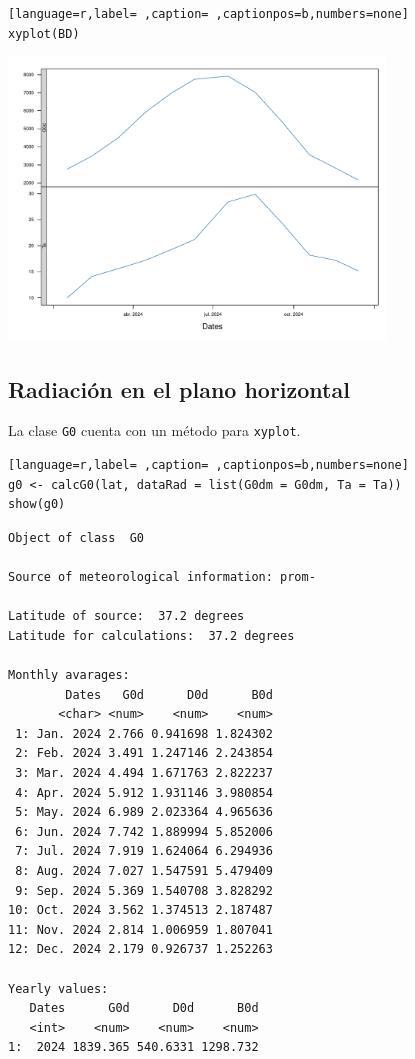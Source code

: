 \begin{lstlisting}[language=r,label= ,caption= ,captionpos=b,numbers=none]
xyplot(BD)
\end{lstlisting}
\begin{center}
\includegraphics[keepaspectratio,width=0.75\textwidth,height=0.5\textheight]{figuras/codigo-meteo.pdf}
\end{center}

\subsection{Radiación en el plano horizontal}
\label{sec:orge431903}
La clase \texttt{G0} cuenta con un método para \texttt{xyplot}.
\begin{lstlisting}[language=r,label= ,caption= ,captionpos=b,numbers=none]
g0 <- calcG0(lat, dataRad = list(G0dm = G0dm, Ta = Ta))
show(g0)
\end{lstlisting}

\begin{verbatim}
Object of class  G0 

Source of meteorological information: prom- 

Latitude of source:  37.2 degrees
Latitude for calculations:  37.2 degrees

Monthly avarages:
        Dates   G0d      D0d      B0d
       <char> <num>    <num>    <num>
 1: Jan. 2024 2.766 0.941698 1.824302
 2: Feb. 2024 3.491 1.247146 2.243854
 3: Mar. 2024 4.494 1.671763 2.822237
 4: Apr. 2024 5.912 1.931146 3.980854
 5: May. 2024 6.989 2.023364 4.965636
 6: Jun. 2024 7.742 1.889994 5.852006
 7: Jul. 2024 7.919 1.624064 6.294936
 8: Aug. 2024 7.027 1.547591 5.479409
 9: Sep. 2024 5.369 1.540708 3.828292
10: Oct. 2024 3.562 1.374513 2.187487
11: Nov. 2024 2.814 1.006959 1.807041
12: Dec. 2024 2.179 0.926737 1.252263

Yearly values:
   Dates      G0d      D0d      B0d
   <int>    <num>    <num>    <num>
1:  2024 1839.365 540.6331 1298.732
\end{verbatim}

